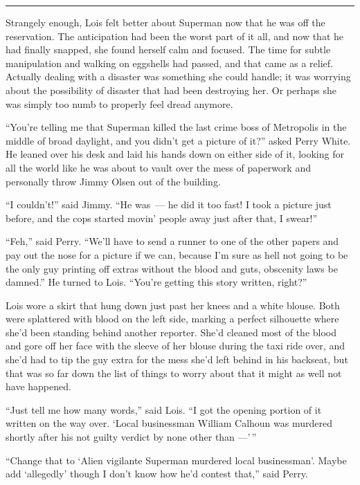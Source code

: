 \documentclass[ebook,12pt]{memoir}
\begin{document}
\begin{center}\rule{0.5\linewidth}{\linethickness}\end{center}

Strangely enough, Lois felt better about Superman now that he was off
the reservation. The anticipation had been the worst part of it all, and
now that he had finally snapped, she found herself calm and focused. The
time for subtle manipulation and walking on eggshells had passed, and
that came as a relief. Actually dealing with a disaster was something
she could handle; it was worrying about the possibility of disaster that
had been destroying her. Or perhaps she was simply too numb to properly
feel dread anymore.

``You're telling me that Superman killed the last crime boss of
Metropolis in the middle of broad daylight, and you didn't get a picture
of it?'' asked Perry White. He leaned over his desk and laid his hands
down on either side of it, looking for all the world like he was about
to vault over the mess of paperwork and personally throw Jimmy Olsen out
of the building.

``I couldn't!'' said Jimmy. ``He was~--- he did it too fast! I took a
picture just before, and the cops started movin' people away just after
that, I swear!''

``Feh,'' said Perry. ``We'll have to send a runner to one of the other
papers and pay out the nose for a picture if we can, because I'm sure as
hell not going to be the only guy printing off extras without the blood
and guts, obscenity laws be damned.'' He turned to Lois. ``You're
getting this story written, right?''

Lois wore a skirt that hung down just past her knees and a white blouse.
Both were splattered with blood on the left side, marking a perfect
silhouette where she'd been standing behind another reporter. She'd
cleaned most of the blood and gore off her face with the sleeve of her
blouse during the taxi ride over, and she'd had to tip the guy extra for
the mess she'd left behind in his backseat, but that was so far down the
list of things to worry about that it might as well not have happened.

``Just tell me how many words,'' said Lois. ``I got the opening portion
of it written on the way over. `Local businessman William Calhoun was
murdered shortly after his not guilty verdict by none other than
---'\,''

``Change that to `Alien vigilante Superman murdered local businessman'.
Maybe add `allegedly' though I don't know how he'd contest that,'' said
Perry.
\end{document}
